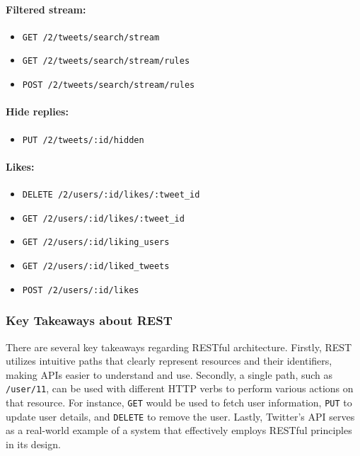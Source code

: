 \paragraph{Filtered stream:}
\begin{itemize}[noitemsep, topsep=4pt]
    \item \texttt{GET /2/tweets/search/stream}
    \item \texttt{GET /2/tweets/search/stream/rules}
    \item \texttt{POST /2/tweets/search/stream/rules}
\end{itemize}

\paragraph{Hide replies:}
\begin{itemize}[noitemsep, topsep=4pt]
    \item \texttt{PUT /2/tweets/:id/hidden}
\end{itemize}

\paragraph{Likes:}
\begin{itemize}[noitemsep, topsep=4pt]
    \item \texttt{DELETE /2/users/:id/likes/:tweet\_id}
    \item \texttt{GET /2/users/:id/likes/:tweet\_id}
    \item \texttt{GET /2/users/:id/liking\_users}
    \item \texttt{GET /2/users/:id/liked\_tweets}
    \item \texttt{POST /2/users/:id/likes}
\end{itemize}

\subsubsection{Key Takeaways about REST}

There are several key takeaways regarding RESTful architecture. Firstly, REST utilizes intuitive paths that clearly represent resources and their identifiers, making APIs easier to understand and use. Secondly, a single path, such as \texttt{/user/11}, can be used with different HTTP verbs to perform various actions on that resource. For instance, \texttt{GET} would be used to fetch user information, \texttt{PUT} to update user details, and \texttt{DELETE} to remove the user. Lastly, Twitter's API serves as a real-world example of a system that effectively employs RESTful principles in its design.

